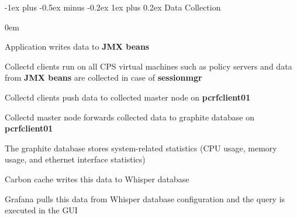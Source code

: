 \documentclass[letterpaper,8pt]{extarticle}
\makeatletter
\renewcommand{\subsubsection}{\@startsection{subsubsection}{3}{0mm}%
  {-1ex plus -0.5ex minus -0.2ex}%
  {1ex plus 0.2ex}%
{\color{h3} \normalfont\fontsize{5.5}{5.5}\selectfont\bfseries\itshape}}
\let\oldenumerate\enumerate \let\endoldenumerate\endenumerate
\renewenvironment{enumerate}{\oldenumerate \itemsep0em}{\endoldenumerate}
\makeatother
\begin{document}
\begin{multicols*}{3}
  \subsubsection{Data Collection}
  
  \begin{enumerate}
    \item Application writes data to \textbf{JMX beans}
    \item Collectd clients run on all CPS virtual machines such as policy servers and data from \textbf{JMX beans} are collected in case of \textbf{sessionmgr}
    \item Collectd clients push data to collected master node on \textbf{pcrfclient01}
    \item Collectd master node forwards collected data to graphite database on \textbf{pcrfclient01}
    \item The graphite database stores system-related statistics (CPU usage, memory usage, and ethernet interface statistics)
    \item Carbon cache writes this data to Whisper database
    \item Grafana pulls this data from Whisper database configuration and the query is executed in the GUI
  \end{enumerate}
  
  \begin{center}
    \vspace{0.4cm}
\end{center}
\end{multicols*}
\end{document}

